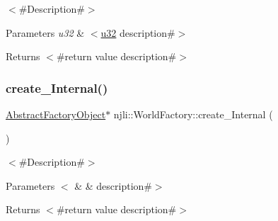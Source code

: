$<$\#\+Description\#$>$


\begin{DoxyParams}{Parameters}
{\em u32} & $<$\mbox{\hyperlink{_util_8h_a10e94b422ef0c20dcdec20d31a1f5049}{u32}} description\#$>$\\
\hline
\end{DoxyParams}
\begin{DoxyReturn}{Returns}
$<$\#return value description\#$>$ 
\end{DoxyReturn}
\mbox{\label{classnjli_1_1_world_factory_a675390383c1fff886cc069b2266b7568}} 
\subsubsection{\texorpdfstring{create\+\_\+\+Internal()}{create\_Internal()}\hspace{0.1cm}{\footnotesize\ttfamily [2/2]}}
{\footnotesize\ttfamily \mbox{\hyperlink{classnjli_1_1_abstract_factory_object}{Abstract\+Factory\+Object}}$\ast$ njli\+::\+World\+Factory\+::create\+\_\+\+Internal (\begin{DoxyParamCaption}\item[{const \mbox{\hyperlink{classnjli_1_1_abstract_builder}{Abstract\+Builder}} \&}]{ }\end{DoxyParamCaption})\hspace{0.3cm}{\ttfamily [protected]}}

$<$\#\+Description\#$>$


\begin{DoxyParams}[1]{Parameters}
$<$ & {\em } & description\#$>$\\
\hline
\end{DoxyParams}
\begin{DoxyReturn}{Returns}
$<$\#return value description\#$>$ 
\end{DoxyReturn}
\mbox{\label{classnjli_1_1_world_factory_ae5012fbab296d02bd57b4bf660bc9cac}} 
